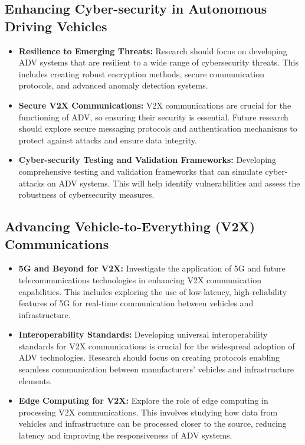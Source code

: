 \documentclass[lettersize,journal]{IEEEtran}
\begin{document}
\subsection{Enhancing Cyber-security in Autonomous Driving Vehicles}
\begin{itemize}
    \item \textbf{Resilience to Emerging Threats:} Research should focus on developing ADV systems that are resilient to a wide range of cybersecurity threats. This includes creating robust encryption methods, secure communication protocols, and advanced anomaly detection systems.
    \item \textbf{Secure V2X Communications:} V2X communications are crucial for the functioning of ADV, so ensuring their security is essential. Future research should explore secure messaging protocols and authentication mechanisms to protect against attacks and ensure data integrity.
    \item \textbf{Cyber-security Testing and Validation Frameworks:} Developing comprehensive testing and validation frameworks that can simulate cyber-attacks on ADV systems. This will help identify vulnerabilities and assess the robustness of cybersecurity measures.
\end{itemize}

\subsection{Advancing Vehicle-to-Everything (V2X) Communications}
\begin{itemize}
    \item \textbf{5G and Beyond for V2X:} Investigate the application of 5G and future telecommunications technologies in enhancing V2X communication capabilities. This includes exploring the use of low-latency, high-reliability features of 5G for real-time communication between vehicles and infrastructure.
    \item \textbf{Interoperability Standards:} Developing universal interoperability standards for V2X communications is crucial for the widespread adoption of ADV technologies. Research should focus on creating protocols enabling seamless communication between manufacturers' vehicles and infrastructure elements.
    \item \textbf{Edge Computing for V2X:} Explore the role of edge computing in processing V2X communications. This involves studying how data from vehicles and infrastructure can be processed closer to the source, reducing latency and improving the responsiveness of ADV systems.
\end{itemize}
\end{document}
